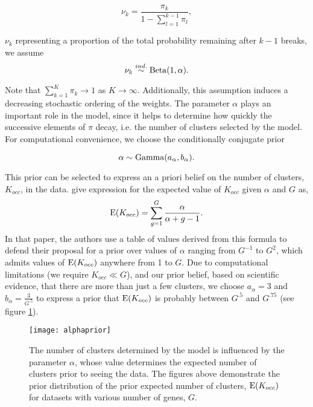 \begin{equation}
\nu_k = \frac{\pi_k}{1 - \sum_{l=1}^{k-1} \pi_l},
\end{equation}

$\nu_k$ representing a proportion of the total probability remaining after $k-1$ breaks, we assume
\begin{equation}
\nu_k \stackrel{ind.}{\sim} \operatorname{Beta}(1, \alpha).
\end{equation}

Note that $\sum_{k=1}^K \pi_k \rightarrow 1$ as $K\rightarrow \infty$. Additionally, this assumption induces a decreasing stochastic ordering of the weights. The parameter $\alpha$ plays an important role in the model, since it helps to determine how quickly the successive elements of $\pi$ decay, i.e. the number of clusters selected by the model. For computational convenience, we choose the conditionally conjugate prior

\begin{equation}
\alpha \sim \operatorname{Gamma}(a_\alpha,b_\alpha).
\end{equation}

This prior can be selected to express an a priori belief on the number of clusters, $K_{occ}$, in the data. \citet{escobar1994} give expression for the expected value of $K_{occ}$ given $\alpha$ and $G$ as,
\begin{equation}
\operatorname{E}(K_{occ})=\sum_{g=1}^{G} \frac{\alpha}{\alpha + g - 1}.
\end{equation}
In that paper, the authors use a table of values derived from this formula to defend their proposal for a prior over values of $\alpha$ ranging from $G^{-1}$ to $G^{2}$, which admits values of $\operatorname{E}(K_{occ})$ anywhere from 1 to $G$. Due to computational limitations (we require $K_{occ} \ll G$), and our prior belief, based on scientific evidence, that there are more than just a few clusters, we choose $a_\alpha=3$ and $b_\alpha=\frac{3}{G^{.5}}$ to express a prior that $\operatorname{E}(K_{occ})$ is probably between $G^{.5}$ and $G^{.75}$ (see figure \ref{alphaprior}).

\begin{figure}
\texttt{[image: alphaprior]}
\caption{The number of clusters determined by the model is influenced by the parameter $\alpha$, whose value determines the expected number of clusters prior to seeing the data. The figures above demonstrate the prior distribution of the prior expected number of clusters, $\operatorname{E}(K_{occ})$ for datasets with various number of genes, $G$.}
\label{alphaprior}
\end{figure}

